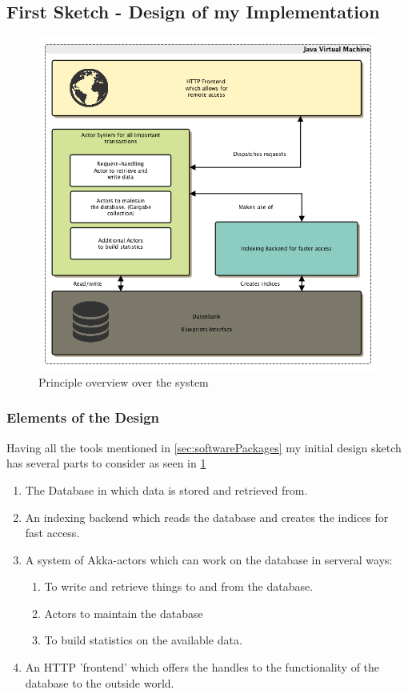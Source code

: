\documentclass[11p]{scrartcl}
\begin{document}
\subsection{First Sketch - Design of my Implementation}
\label{sec:firstSketch}

\begin{figure}[h!]		
 	\includegraphics[scale=0.5]{figures/roughOverview.png}
	\caption{Principle overview over the system}
	\label{fig:roughOverview}
\end{figure}

\subsubsection{Elements of the Design}
Having all the tools mentioned in \ref{sec:softwarePackages} my initial design sketch has several parts to consider as seen in \ref{fig:roughOverview}
\begin{enumerate}
	\item The Database in which data is stored and retrieved from.
	\item An indexing backend which reads the database and creates the indices for fast access.
	\item A system of Akka-actors which can work on the database in serveral ways:
	\begin{enumerate}
		\item To write and retrieve things to and from the database.
		\item Actors to maintain the database
		\item To build statistics on the available data.		
	\end{enumerate}	
	\item An HTTP 'frontend' which offers the handles to the functionality of the database to the outside world.
\end{enumerate}
\end{document}
